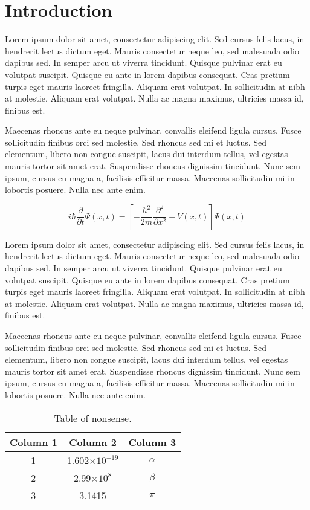 \chapter{Introduction}

Lorem ipsum dolor sit amet, consectetur adipiscing elit. Sed cursus felis lacus, in hendrerit lectus dictum eget. Mauris consectetur neque leo, sed malesuada odio dapibus sed. In semper arcu ut viverra tincidunt. Quisque pulvinar erat eu volutpat suscipit. Quisque eu ante in lorem dapibus consequat. Cras pretium turpis eget mauris laoreet fringilla. Aliquam erat volutpat. In sollicitudin at nibh at molestie. Aliquam erat volutpat. Nulla ac magna maximus, ultricies massa id, finibus est.

Maecenas rhoncus ante eu neque pulvinar, convallis eleifend ligula cursus. Fusce sollicitudin finibus orci sed molestie. Sed rhoncus sed mi et luctus. Sed elementum, libero non congue suscipit, lacus dui interdum tellus, vel egestas mauris tortor sit amet erat. Suspendisse rhoncus dignissim tincidunt. Nunc sem ipsum, cursus eu magna a, facilisis efficitur massa. Maecenas sollicitudin mi in lobortis posuere. Nulla nec ante enim.

\begin{equation}
    i\hbar\frac{\partial}{\partial t}\Psi \left(x,t\right) = \left[-\frac{\hbar^2}{2m}
\frac{\partial^2}{\partial x^2} + V\left(x,t\right)\right]\Psi\left(x,t\right)
\end{equation}

Lorem ipsum dolor sit amet, consectetur adipiscing elit. Sed cursus felis lacus, in hendrerit lectus dictum eget. Mauris consectetur neque leo, sed malesuada odio dapibus sed. In semper arcu ut viverra tincidunt. Quisque pulvinar erat eu volutpat suscipit. Quisque eu ante in lorem dapibus consequat. Cras pretium turpis eget mauris laoreet fringilla. Aliquam erat volutpat. In sollicitudin at nibh at molestie. Aliquam erat volutpat. Nulla ac magna maximus, ultricies massa id, finibus est.

Maecenas rhoncus ante eu neque pulvinar, convallis eleifend ligula cursus. Fusce sollicitudin finibus orci sed molestie. Sed rhoncus sed mi et luctus. Sed elementum, libero non congue suscipit, lacus dui interdum tellus, vel egestas mauris tortor sit amet erat. Suspendisse rhoncus dignissim tincidunt. Nunc sem ipsum, cursus eu magna a, facilisis efficitur massa. Maecenas sollicitudin mi in lobortis posuere. Nulla nec ante enim.

\begin{table}[h!]
    \begin{center}
    \caption{Table of nonsense.}
    \bigskip
    \label{tab:label}
    \begin{tabular}{c c c}
        \textbf{Column 1} & \textbf{Column 2} & \textbf{Column 3}\\
        \hline
        1 & 1.602$\times 10^{-19}$ & $\alpha$ \\
        2 & 2.99$\times 10^{8}$ & $\beta$ \\
        3 & 3.1415 & $\pi$ \\
        \hline
    \end{tabular}
    \end{center}
\end{table}


